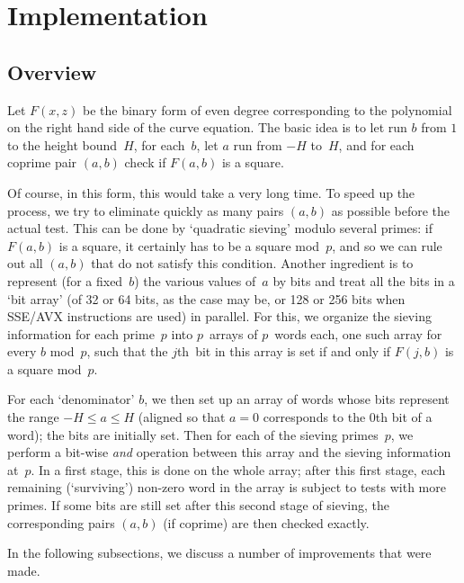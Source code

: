 \documentclass[12pt,a4paper,oneside]{amsart}
\begin{document}

\section{Implementation} \label{impl}

\subsection{Overview}

Let $F(x, z)$ be the binary form of even degree corresponding to the
polynomial on the right hand side of the curve equation. The basic idea
is to let run $b$ from $1$ to the height bound~$H$, for each~$b$, let
$a$ run from $-H$ to~$H$, and for each coprime pair $(a,b)$ check
if $F(a, b)$ is a square.

Of course, in this form, this would take a very long time. To speed up the
process, we try to eliminate quickly as many pairs $(a, b)$ as possible
before the actual test. This can be done by `quadratic sieving' modulo
several primes: if $F(a, b)$ is a square, it certainly has to be a square
mod~$p$, and so we can rule out all $(a, b)$ that do not satisfy this
condition. Another ingredient is to represent (for a fixed~$b$) the
various values of~$a$ by bits and treat all the bits in a `bit array'
(of 32 or 64 bits, as the case may be, or 128 or 256 bits when SSE/AVX
instructions are used) in parallel. For this, we organize
the sieving information for each prime~$p$ into $p$~arrays of $p$~words
each, one such array for every $b$ mod~$p$, such that the $j$th~bit
in this array is set if and only if $F(j, b)$ is a square mod~$p$.

For each `denominator' $b$, we then set up an array of words whose bits
represent the range $-H \le a \le H$ (aligned so that $a = 0$ corresponds
to the $0$th bit of a word); the bits are initially set. Then for each
of the sieving primes~$p$, we perform a bit-wise {\em and} operation
between this array and the sieving information at~$p$. In a first stage,
this is done on the whole array; after this first stage, each remaining
(`surviving') non-zero word in the array is subject to tests with more
primes. If some bits are still set after this second stage of sieving,
the corresponding pairs $(a, b)$ (if coprime) are then checked exactly.

In the following subsections, we discuss a number of improvements that
were made.
\end{document}
